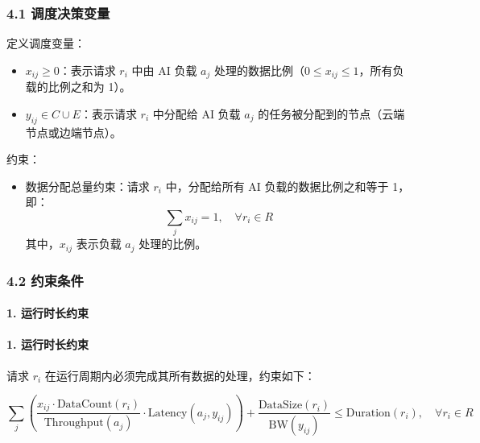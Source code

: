 \subsubsection*{4.1 调度决策变量}
定义调度变量：
\begin{itemize}
    \item \( x_{ij} \geq 0 \)：表示请求 \( r_i \) 中由 AI 负载 \( a_j \) 处理的数据比例（\(0 \leq x_{ij} \leq 1\)，所有负载的比例之和为 1）。
    \item \( y_{ij} \in C \cup E \)：表示请求 \( r_i \) 中分配给 AI 负载 \( a_j \) 的任务被分配到的节点（云端节点或边端节点）。
\end{itemize}

约束：
\begin{itemize}
    \item 数据分配总量约束：请求 \( r_i \) 中，分配给所有 AI 负载的数据比例之和等于 1，即：
    \[
    \sum_{j} x_{ij} = 1, \quad \forall r_i \in R
    \]
    其中，\( x_{ij} \) 表示负载 \( a_j \) 处理的比例。
\end{itemize}

\subsubsection*{4.2 约束条件}

\paragraph*{1. 运行时长约束}


\paragraph*{1. 运行时长约束}

请求 \( r_i \) 在运行周期内必须完成其所有数据的处理，约束如下：

\[
\sum_{j} \left( \frac{x_{ij} \cdot \text{DataCount}(r_i)}{\text{Throughput}(a_j)} \cdot \text{Latency}(a_j, y_{ij}) \right) + \frac{\text{DataSize}(r_i)}{\text{BW}(y_{ij})} \leq \text{Duration}(r_i), \quad \forall r_i \in R
\]

